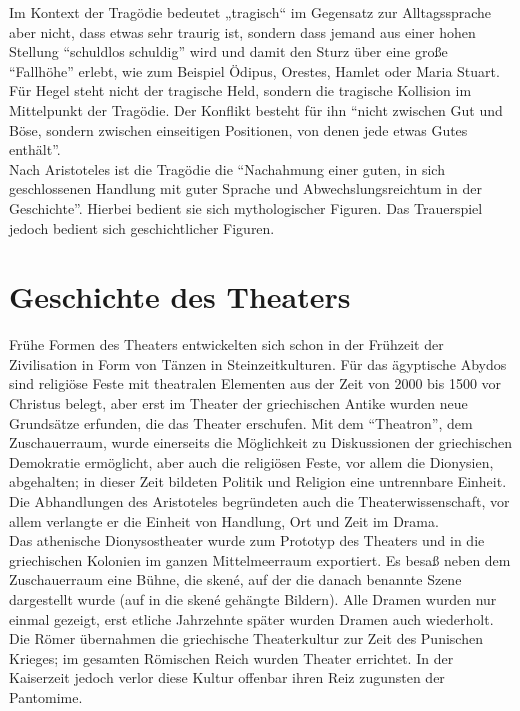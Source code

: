 \documentclass[ngerman, a4paper, twoside]{scrbook}%
\begin{document}
	Im Kontext der Tragödie bedeutet „tragisch“ im Gegensatz zur Alltagssprache aber nicht, dass etwas sehr traurig ist, sondern dass jemand aus einer hohen Stellung "`schuldlos schuldig"' wird und damit den Sturz über eine große "`Fallhöhe"' erlebt, wie zum Beispiel Ödipus, Orestes, Hamlet oder Maria Stuart.\\

	Für Hegel steht nicht der tragische Held, sondern die tragische Kollision im Mittelpunkt der Tragödie. Der Konflikt besteht für ihn "`nicht zwischen Gut und Böse, sondern zwischen einseitigen Positionen, von denen jede etwas Gutes enthält"'.\\

	Nach Aristoteles ist die Tragödie die "`Nachahmung einer guten, in sich geschlossenen Handlung mit guter Sprache und Abwechslungsreichtum in der Geschichte"'. Hierbei bedient sie sich mythologischer Figuren. Das Trauerspiel jedoch bedient sich geschichtlicher Figuren.

	\section{Geschichte des Theaters}
	Frühe Formen des Theaters entwickelten sich schon in der Frühzeit der Zivilisation in Form von Tänzen in Steinzeitkulturen. Für das ägyptische Abydos sind religiöse Feste mit theatralen Elementen aus der Zeit von 2000 bis 1500 vor Christus belegt, aber erst im Theater der griechischen Antike wurden neue Grundsätze erfunden, die das Theater erschufen. Mit dem "`Theatron"', dem Zuschauerraum, wurde einerseits die Möglichkeit zu Diskussionen der griechischen Demokratie ermöglicht, aber auch die religiösen Feste, vor allem die Dionysien, abgehalten; in dieser Zeit bildeten Politik und Religion eine untrennbare Einheit. Die Abhandlungen des Aristoteles begründeten auch die Theaterwissenschaft, vor allem verlangte er die Einheit von Handlung, Ort und Zeit im Drama.\\

	Das athenische Dionysostheater wurde zum Prototyp des Theaters und in die griechischen Kolonien im ganzen Mittelmeerraum exportiert. Es besaß neben dem Zuschauerraum eine Bühne, die skené, auf der die danach benannte Szene dargestellt wurde (auf in die skené gehängte Bildern). Alle Dramen wurden nur einmal gezeigt, erst etliche Jahrzehnte später wurden Dramen auch wiederholt.\\

	Die Römer übernahmen die griechische Theaterkultur zur Zeit des Punischen Krieges; im gesamten Römischen Reich wurden Theater errichtet. In der Kaiserzeit jedoch verlor diese Kultur offenbar ihren Reiz zugunsten der Pantomime.\\
\end{document}
